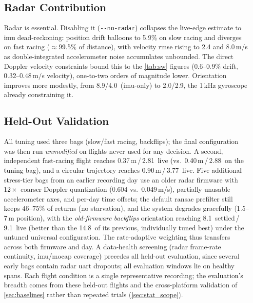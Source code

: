 \subsection{Radar Contribution}
Radar is essential.  Disabling it (\texttt{-{}-no-radar}) collapses the
live-edge estimate to \ac{imu} dead-reckoning: position drift balloons to
5.9\% on slow racing and diverges on fast racing ($\approx$99.5\% of
distance), with velocity \ac{rmse} rising to 2.4 and 8.0\,m/s as
double-integrated accelerometer noise accumulates unbounded.  The direct
Doppler velocity constraints bound this to the \autoref{tab:sw} figures
(0.6--0.9\% drift, 0.32--0.48\,m/s velocity), one-to-two orders of magnitude
lower.  Orientation
improves more modestly, from 8.9\degree/4.0\degree\ (\ac{imu}-only) to
2.0\degree/2.9\degree, the 1\,kHz gyroscope already constraining it.

\subsection{Held-Out Validation}
\label{sec:heldout}
All tuning used three bags (slow/fast racing, backflips); the final
configuration was then run \emph{unmodified} on flights never used for
any decision.  A second, independent fast-racing flight reaches
0.37\,m\,/\,2.81\degree\ live (vs.\ 0.40\,m\,/\,2.88\degree\ on the
tuning bag), and a circular trajectory reaches
0.90\,m\,/\,3.77\degree\ live.
Five additional stress-tier bags from an earlier recording day use an
older radar firmware with $12\times$ coarser Doppler quantization
(0.604 vs.\ 0.049\,m/s), partially unusable accelerometer axes, and
per-day time offsets; the default \ac{ransac} prefilter still keeps
$46$--$75\%$ of returns (no starvation), and the system degrades
gracefully (1.5--7\,m position), with the \emph{old-firmware backflips}
orientation reaching 8.1\degree\ settled\,/\,9.1\degree\ live (better
than the 14.8\degree\ of its previous, individually tuned best) under
the untuned universal configuration.  The rate-adaptive weighting thus
transfers across both firmware and day.
A data-health screening (radar frame-rate continuity, \ac{imu}/\ac{mocap}
coverage) precedes all held-out evaluation, since several early bags
contain radar \ac{uart} dropouts; all evaluation windows lie on healthy
spans.  Each flight condition is a single representative recording; the
evaluation's breadth comes from these held-out flights and the
cross-platform validation of \autoref{sec:baselines} rather than
repeated trials (\autoref{sec:stat_scope}).

